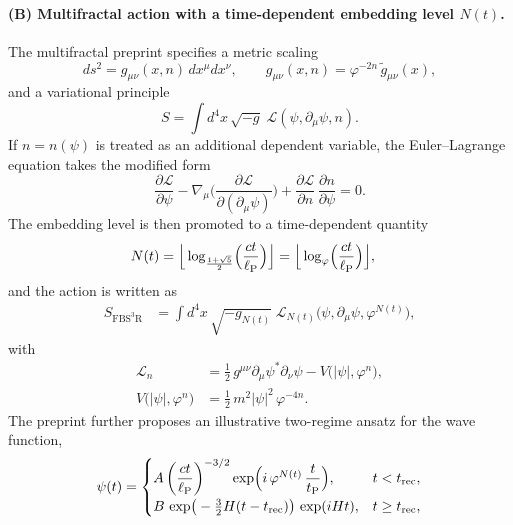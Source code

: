 \documentclass[
  reprint,
  amsmath,amssymb,
  aps,
  prd,
  superscriptaddress,
  nofootinbib,
  longbibliography
]{revtex4-2}
\newcommand{\phig}{\varphi}
\newcommand{\ellP}{\ell_{\rm P}}
\newcommand{\tP}{t_{\rm P}}
\theoremstyle{definition}
\theoremstyle{remark}
\begin{document}
\paragraph{(B) Multifractal action with a time-dependent embedding level $N(t)$.}
The multifractal preprint specifies a metric scaling
\begin{equation}
ds^2=g_{\mu\nu}(x,n)\,dx^\mu dx^\nu,
\qquad
g_{\mu\nu}(x,n)=\phig^{-2n}\,\tilde g_{\mu\nu}(x),
\label{eq:metric-multifractal}
\end{equation}
and a variational principle
\begin{equation}
S=\int d^4x\,\sqrt{-g}\;\mathcal{L}(\psi,\partial_\mu\psi,n).
\label{eq:action-multifractal}
\end{equation}
If $n=n(\psi)$ is treated as an additional dependent variable, the Euler--Lagrange equation takes the modified form
\begin{equation}
\frac{\partial\mathcal{L}}{\partial\psi}-\nabla_\mu\!\Big(\frac{\partial\mathcal{L}}{\partial(\partial_\mu\psi)}\Big)
+\frac{\partial\mathcal{L}}{\partial n}\,\frac{\partial n}{\partial\psi}=0.
\label{eq:EL-multifractal}
\end{equation}
The embedding level is then promoted to a time-dependent quantity
\begin{equation}
\begin{split}
N(t)
&=\Big\lfloor\log_{\frac{1+\sqrt5}{2}}\!\Big(\frac{ct}{\ellP}\Big)\Big\rfloor
 =\Big\lfloor\log_{\phig}\!\Big(\frac{ct}{\ellP}\Big)\Big\rfloor,
\end{split}
\label{eq:Nt-floor}
\end{equation}
and the action is written as
\begin{equation}
\begin{split}
S_{\mathrm{FBS^3R}}
&=\int d^4x\,\sqrt{-g_{N(t)}}\;
\mathcal{L}_{N(t)}\!\Big(\psi,\partial_\mu\psi,\phig^{N(t)}\Big),
\end{split}
\label{eq:action-Nt}
\end{equation}
with
\begin{align}
\mathcal{L}_{n}
&=\frac12\,g^{\mu\nu}\partial_\mu\psi^\ast\partial_\nu\psi
-V\!\big(|\psi|,\phig^{n}\big),
\nonumber\\
V\!\big(|\psi|,\phig^{n}\big)
&=\frac12\,m^2|\psi|^2\,\phig^{-4n}.
\label{eq:L-Nt}
\end{align}
The preprint further proposes an illustrative two-regime ansatz for the wave function,
\begin{equation}
\psi(t)=
\begin{cases}
A\left(\dfrac{ct}{\ellP}\right)^{-3/2}\exp\!\Big(i\,\phig^{N(t)}\,\dfrac{t}{\tP}\Big),
& t<t_{\rm rec},
\\[0.6em]
B\,\exp\!\big(-\tfrac32 H(t-t_{\rm rec})\big)\,\exp(iHt), & t\ge t_{\rm rec},
\end{cases}
\label{eq:psi-ansatz}
\end{equation}
\end{document}

